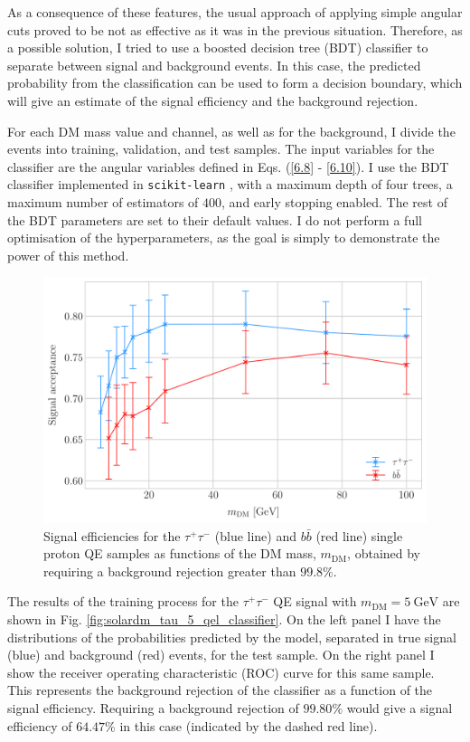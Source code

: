 As a consequence of these features, the usual approach of applying simple angular cuts proved to be not as effective as it was in the previous situation. Therefore, as a possible solution, I tried to use a boosted decision tree (BDT) classifier to separate between signal and background events. In this case, the predicted probability from the classification can be used to form a decision boundary, which will give an estimate of the signal efficiency and the background rejection.

For each DM mass value and channel, as well as for the background, I divide the events into training, validation, and test samples. The input variables for the classifier are the angular variables defined in Eqs. (\ref{6.8} - \ref{6.10}). I use the BDT classifier implemented in \texttt{scikit-learn} \cite{scikit-learn}, with a maximum depth of four trees, a maximum number of estimators of $400$, and early stopping enabled. The rest of the BDT parameters are set to their default values. I do not perform a full optimisation of the hyperparameters, as the goal is simply to demonstrate the power of this method.

\begin{figure}[t]
	\centering
	\includegraphics[width=0.9\linewidth]{Images/DM_Analysis/solardm_qel_signal_acceptance_new.pdf}
	\caption[Signal efficiencies for the $\tau^{+} \tau^{-}$ and $b\bar{b}$ single proton QE samples as functions of the DM mass.]{Signal efficiencies for the $\tau^{+} \tau^{-}$ (blue line) and $b\bar{b}$ (red line) single proton QE samples as functions of the DM mass, $m_{\mathrm{DM}}$, obtained by requiring a background rejection greater than $99.8\%$.}
	\label{fig:solardm_qel_signal_acceptance}
\end{figure}

The results of the training process for the $\tau^{+}\tau^{-}$ QE signal with $m_{\mathrm{DM}} = 5 \ \mathrm{GeV}$ are shown in Fig. \ref{fig:solardm_tau_5_qel_classifier}. On the left panel I have the distributions of the probabilities predicted by the model, separated in true signal (blue) and background (red) events, for the test sample. On the right panel I show the receiver operating characteristic (ROC) curve for this same sample. This represents the background rejection of the classifier as a function of the signal efficiency. Requiring a background rejection of $99.80\%$ would give a signal efficiency of $64.47\%$ in this case (indicated by the dashed red line).

